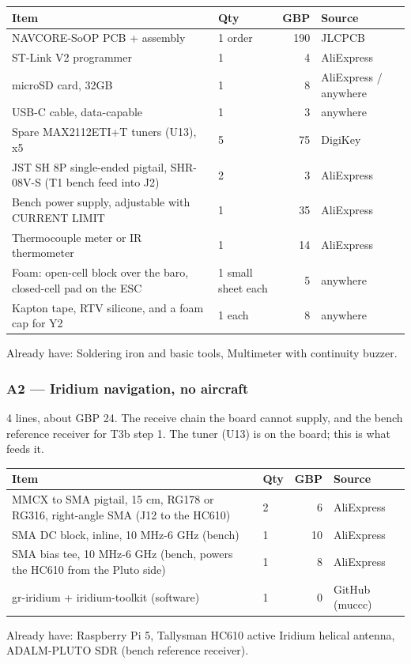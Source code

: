 \documentclass[11pt,a4paper]{article}
\begin{document}
\begin{longtable}{@{}P{0.50\textwidth}P{0.12\textwidth}rP{0.22\textwidth}@{}}
\toprule
\textbf{Item} & \textbf{Qty} & \textbf{GBP} & \textbf{Source} \\ \midrule
\endhead
\bottomrule
\endfoot
NAVCORE-SoOP PCB + assembly & 1 order & 190 & JLCPCB \\
ST-Link V2 programmer & 1 & 4 & AliExpress \\
microSD card, 32GB & 1 & 8 & AliExpress / anywhere \\
USB-C cable, data-capable & 1 & 3 & anywhere \\
Spare MAX2112ETI+T tuners (U13), x5 & 5 & 75 & DigiKey \\
JST SH 8P single-ended pigtail, SHR-08V-S (T1 bench feed into J2) & 2 & 3 & AliExpress \\
Bench power supply, adjustable with CURRENT LIMIT & 1 & 35 & AliExpress \\
Thermocouple meter or IR thermometer & 1 & 14 & AliExpress \\
Foam: open-cell block over the baro, closed-cell pad on the ESC & 1 small sheet each & 5 & anywhere \\
Kapton tape, RTV silicone, and a foam cap for Y2 & 1 each & 8 & anywhere \\
\end{longtable}
Already have: Soldering iron and basic tools, Multimeter with continuity buzzer.

\subsubsection*{A2 --- Iridium navigation, no aircraft} 4 lines, about GBP 24.
The receive chain the board cannot supply, and the bench reference receiver for T3b step 1. The tuner (U13) is on the board; this is what feeds it.

\begin{longtable}{@{}P{0.50\textwidth}P{0.12\textwidth}rP{0.22\textwidth}@{}}
\toprule
\textbf{Item} & \textbf{Qty} & \textbf{GBP} & \textbf{Source} \\ \midrule
\endhead
\bottomrule
\endfoot
MMCX to SMA pigtail, 15 cm, RG178 or RG316, right-angle SMA (J12 to the HC610) & 2 & 6 & AliExpress \\
SMA DC block, inline, 10 MHz-6 GHz (bench) & 1 & 10 & AliExpress \\
SMA bias tee, 10 MHz-6 GHz (bench, powers the HC610 from the Pluto side) & 1 & 8 & AliExpress \\
gr-iridium + iridium-toolkit (software) & 1 & 0 & GitHub (muccc) \\
\end{longtable}
Already have: Raspberry Pi 5, Tallysman HC610 active Iridium helical antenna, ADALM-PLUTO SDR (bench reference receiver).
\end{document}
